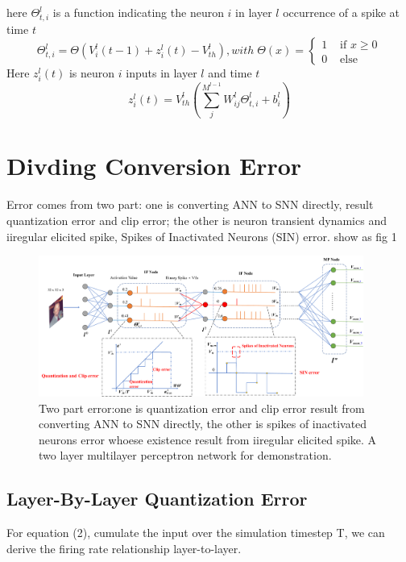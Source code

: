 \documentclass{article}
\begin{document}
here $\Theta_{t,i}^{l}$ is a function indicating the neuron $i$ in layer $l$ occurrence of a spike at time $t$
\begin{equation}
  \Theta_{t, i}^{l}=\Theta\left(V_{i}^{l}(t-1)+z_{i}^{l}(t)-V_{th}^l\right), with \; \Theta(x)= \begin{cases}1 & \text { if } x \geq 0 \\ 0 & \text { else }\end{cases}
\end{equation}
Here $z_i^l(t)$ is neuron $i$ inputs in layer $l$ and time $t$
\begin{equation}
  z_{i}^{l}(t) = V_{th}^l\left(\sum_j^{M^{l-1}}W_{ij}^l\Theta_{t,i}^{l}+b_i^l\right)
\end{equation}

\section{Divding Conversion Error}
Error comes from two part: one is converting ANN to SNN directly, result quantization error and clip error; the other is neuron transient dynamics and iiregular elicited spike, Spikes of Inactivated Neurons
(SIN) error.
show as fig 1
\begin{figure}[htbp]
  \centering
  \includegraphics[width=0.95\textwidth]{error.pdf}
  \caption{Two part error:one is quantization error and clip error result from converting ANN to SNN directly, the other is spikes of inactivated neurons error whoese existence result from iiregular elicited spike. A two layer multilayer perceptron network for demonstration.}
\end{figure}
\subsection{Layer-By-Layer Quantization Error}

For equation (2), cumulate the input over the simulation timestep T, we can derive the firing rate relationship layer-to-layer.
\end{document}
